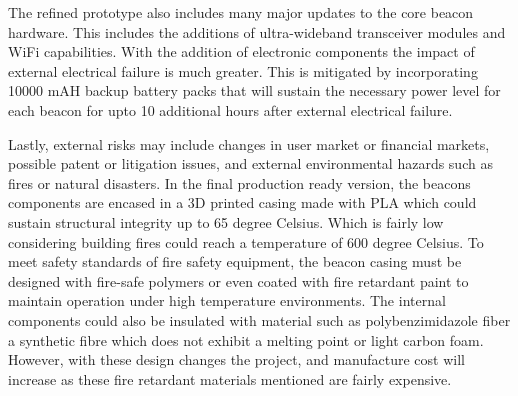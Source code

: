 \bigskip
The refined prototype also includes many major updates to the core beacon hardware. This includes the additions of ultra-wideband transceiver modules and WiFi capabilities. With the addition of electronic components the impact of external electrical failure is much greater. This is mitigated by incorporating 10000 mAH backup battery packs that will sustain the necessary power level for each beacon for upto 10 additional hours after external electrical failure.

\bigskip
Lastly, external risks may include changes in user market or financial markets, possible patent or litigation issues, and external environmental hazards such as fires or natural disasters. In the final production ready version, the beacons components are encased in a 3D printed casing made with PLA which could sustain structural integrity up to 65 degree Celsius. Which is fairly low considering building fires could reach a temperature of 600 degree Celsius. To meet safety standards of fire safety equipment, the beacon casing must be designed with fire-safe polymers or even coated with fire retardant paint to maintain operation under high temperature environments. The internal components could also be insulated with material such as polybenzimidazole fiber a synthetic fibre which does not exhibit a melting point or light carbon foam. However, with these design changes the project, and manufacture cost will increase as these fire retardant materials mentioned are fairly expensive. 
